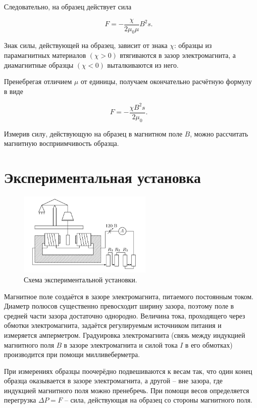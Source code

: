\documentclass[a4paper,12pt]{article} %
\begin{document}
Следовательно, на образец действует сила

\begin{equation}\label{4}
F = -\frac{\chi}{2\mu_0\mu}B^2s.
\end{equation}

Знак силы, действующей на образец, зависит от знака $ \chi $: образцы из парамагнитных материалов $( \chi  > 0)$ втягиваются в зазор электромагнита, а диамагнитные образцы $ (\chi < 0) $ выталкиваются из него.

Пренебрегая отличием $ \mu $ от единицы, получаем окончательно расчётную формулу в виде

\begin{equation}\label{5}
F = -\frac{\chi B^2s}{2\mu_0}.
\end{equation}

Измерив силу, действующую на образец в магнитном поле $ B $, можно рассчитать магнитную восприимчивость образца.

\section{Экспериментальная установка}

\begin{figure}
	\includegraphics[width=6.5cm]{scheme.png}
	\caption{Схема экспериментальной установки.}
	\label{pic:1}
\end{figure}


Магнитное поле создаётся в зазоре электромагнита, питаемого постоянным током. Диаметр полюсов существенно превосходит ширину зазора, поэтому поле в средней части зазора достаточно однородно. Величина тока, проходящего через обмотки электромагнита, задаётся регулируемым источником питания и измеряется амперметром. Градуировка электромагнита (связь между индукцией магнитного поля $ B $ в зазоре электромагнита и силой тока $ I $ в его обмотках) производится при помощи милливеберметра.


При измерениях образцы поочерёдно подвешиваются к весам так, что один конец образца оказывается в зазоре электромагнита, а другой -- вне зазора, где индукцией магнитного поля можно пренебречь. При помощи весов определяется перегрузка $ \Delta P = F $ -- сила, действующая на образец со стороны магнитного поля.
\end{document}
